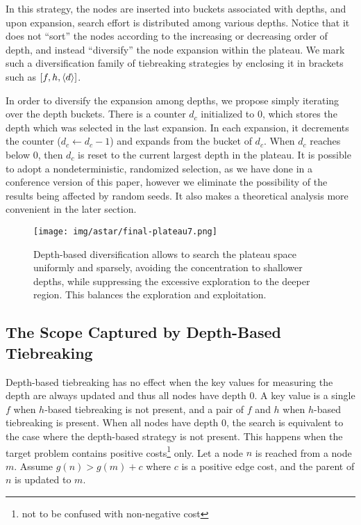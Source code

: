 In this strategy, the nodes are inserted into buckets
associated with depths, and upon expansion, search effort is distributed
among various depths. Notice that it does not ``sort'' the nodes
according to the increasing or decreasing order of depth,
and instead ``diversify'' the node expansion
within the plateau. We mark such a diversification family of
tiebreaking strategies by enclosing it in brackets such as $[f,h,{\left<d\right>}]$.

In order to diversify the expansion among depths, we propose simply
iterating over the depth buckets. There is a counter $d_c$ initialized
to 0, which stores the depth which was selected in the last expansion.
In each expansion, it decrements the counter ($d_c\leftarrow d_c-1$) and
expands from the bucket of $d_c$. When $d_c$ reaches below 0, then $d_c$
is reset to the current largest depth in the plateau.
It is possible to adopt a
nondeterministic, randomized selection, as we have done in a conference
version of this paper, however we eliminate the possibility of the
results being affected by random seeds. It also makes a theoretical
analysis more convenient in the later section.

\begin{figure}[htbp]
 \centering
 \texttt{[image: img/astar/final-plateau7.png]}
 \caption{Depth-based diversification allows \astar to search the plateau space
 uniformly and sparsely, avoiding the concentration to shallower depths, while
 suppressing the excessive exploration to the deeper region. This
 balances the exploration and exploitation.}
 \label{fig:plateau-depiction-all-optimal}
\end{figure}


\subsection{The Scope Captured by Depth-Based Tiebreaking}

Depth-based tiebreaking has no effect when the key values for measuring
the depth are always updated and thus all nodes have depth 0. A key
value is a single $f$ when $h$-based tiebreaking is not present, and a
pair of $f$ and $h$ when $h$-based tiebreaking is present. When all
nodes have depth 0, the search is equivalent to the case where 
the depth-based strategy is not present.
% 
This happens when the target problem contains
positive costs\footnote{not to be confused with non-negative cost} only.
Let a node $n$ is reached from a node $m$. Assume
 $g(n)>g(m)+c$ where $c$ is a positive edge cost, and the parent of $n$
 is updated to $m$.

